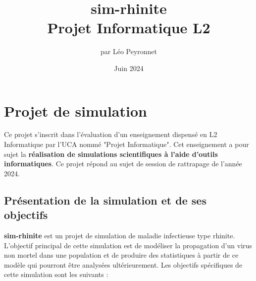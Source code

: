 \documentclass[12pt,french,titlepage]{article}
\author{par Léo Peyronnet}
\title{sim-rhinite\\[1ex] \large Projet Informatique L2}
\date{Juin 2024}
\begin{document}
\maketitle

\tableofcontents
\newpage

\section{Projet de simulation}
Ce projet s'inscrit dans l'évaluation d'un enseignement dispensé en L2 Informatique par l'UCA nommé "Projet Informatique". Cet enseignement a pour sujet la \textbf{réalisation de simulations scientifiques à l'aide d'outils informatiques}. Ce projet répond au sujet de session de rattrapage de l'année 2024.  

\subsection{Présentation de la simulation et de ses objectifs}
\label{sec:objectifs}
\textbf{sim-rhinite} est un projet de simulation de maladie infectieuse type rhinite. L'objectif principal de cette simulation est de modéliser la propagation d'un virus non mortel dans une population et de produire des statistiques à partir de ce modèle qui pourront être analysées ultérieurement.
Les objectifs spécifiques de cette simulation sont les suivants :
\end{document}
